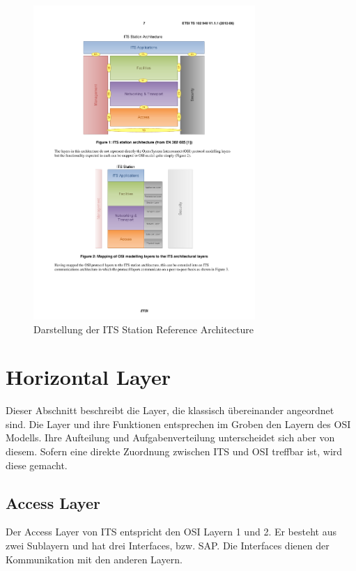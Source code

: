 \begin{figure}
	\includegraphics[width=0.75\textwidth]{content/images/02_architektur/stationReferenceArchitecture.pdf}
	\caption{Darstellung der ITS Station Reference Architecture \cite{ts102940}}
	\label{fig:funktionsweise_referenceArchitecture}
\end{figure}

\section{Horizontal Layer \label{architektur_horzontalLayer}}
Dieser Abschnitt beschreibt die Layer, die klassisch übereinander angeordnet sind. Die Layer und ihre Funktionen entsprechen im Groben den Layern des \ac{OSI} Modells. Ihre Aufteilung und Aufgabenverteilung unterscheidet sich aber von diesem. Sofern eine direkte Zuordnung zwischen \ac{ITS} und \ac{OSI} treffbar ist, wird diese gemacht.

\subsection{Access Layer \label{subsec:accessLayer}}
Der Access Layer von ITS entspricht den \ac{OSI} Layern 1 und 2. Er besteht aus zwei Sublayern und hat drei Interfaces, bzw. \ac{SAP}. Die Interfaces dienen der Kommunikation mit den anderen Layern.

